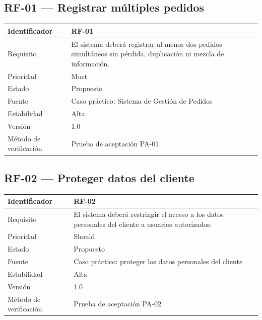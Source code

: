 \documentclass[12pt,a4paper]{article}
\begin{document}
\subsection*{RF-01 --- Registrar múltiples pedidos}
\begin{tabularx}{\textwidth}{|p{4cm}|X|}\hline
Identificador & RF-01 \\\hline
Requisito & El sistema deberá registrar al menos dos pedidos simultáneos sin pérdida, duplicación ni mezcla de información. \\\hline
Prioridad & Must \\\hline
Estado & Propuesto \\\hline
Fuente & Caso práctico: Sistema de Gestión de Pedidos \\\hline
Estabilidad & Alta \\\hline
Versión & 1.0 \\\hline
Método de verificación & Prueba de aceptación PA-01 \\\hline
\end{tabularx}

\subsection*{RF-02 --- Proteger datos del cliente}
\begin{tabularx}{\textwidth}{|p{4cm}|X|}\hline
Identificador & RF-02 \\\hline
Requisito & El sistema deberá restringir el acceso a los datos personales del cliente a usuarios autorizados. \\\hline
Prioridad & Should \\\hline
Estado & Propuesto \\\hline
Fuente & Caso práctico: proteger los datos personales del cliente \\\hline
Estabilidad & Alta \\\hline
Versión & 1.0 \\\hline
Método de verificación & Prueba de aceptación PA-02 \\\hline
\end{tabularx}
\end{document}
